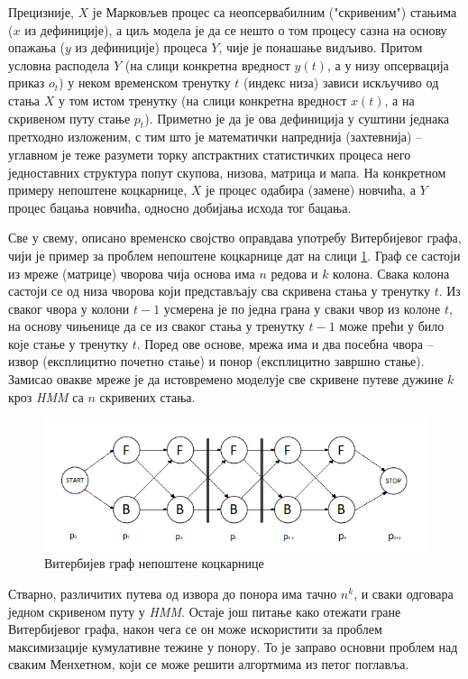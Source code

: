 \documentclass[12pt,oneside]{memoir}
\begin{document}
\begin{CJK}{UTF8}{ipxm}
Прецизније, $X$ је Марковљев процес са неопсервабилним ("скривеним") стањима ($x$ из дефиниције), а циљ модела је да се нешто о том процесу сазна на основу опажања ($y$ из дефиниције) процеса $Y$, чије је понашање видљиво. Притом условна расподела $Y$ (на слици конкретна вредност $y(t)$, а у низу опсервација приказ $o_t$) у неком временском тренутку $t$ (индекс низа) зависи искључиво од стања $X$ у том истом тренутку (на слици конкретна вредност $x(t)$, а на скривеном путу стање $p_t$). Приметно је да је ова дефиниција у суштини једнака претходно изложеним, с тим што је математички напреднија (захтевнија) -- углавном је теже разумети торку апстрактних статистичких процеса него једноставних структура попут скупова, низова, матрица и мапа. На конкретном примеру непоштене коцкарнице, $X$ је процес одабира (замене) новчића, а $Y$ процес бацања новчића, односно добијања исхода тог бацања.

Све у свему, описано временско својство оправдава употребу Витербијевог графа, чији је пример за проблем непоштене коцкарнице дат на слици \ref{fig:kockvit}. Граф се састоји из мреже (матрице) чворова чија основа има $n$ редова и $k$ колона. Свака колона састоји се од низа чворова који представљају сва скривена стања у тренутку $t$. Из сваког чвора у колони $t-1$ усмерена је по једна грана у сваки чвор из колоне $t$, на основу чињенице да се из сваког стања у тренутку $t-1$ може прећи у било које стање у тренутку $t$. Поред ове основе, мрежа има и два посебна чвора -- извор (експлицитно почетно стање) и понор (експлицитно завршно стање). Замисао овакве мреже је да истовремено моделује све скривене путеве дужине $k$ кроз \textit{HMM} са $n$ скривених стања.

\begin{figure}[H]
  \centering
  \includegraphics[width=\textwidth]{kock_graf.png}
  \caption{Витербијев граф непоштене коцкарнице}
  \label{fig:kockvit}
\end{figure}

Стварно, различитих путева од извора до понора има тачно $n^k$, и сваки одговара једном скривеном путу у \textit{HMM}. Остаје још питање како отежати гране Витербијевог графа, након чега се он може искористити за проблем максимизације кумулативне тежине у понору. То је заправо основни проблем над сваким Менхетном, који се може решити алгортмима из петог поглавља.


\end{CJK}
\end{document}

